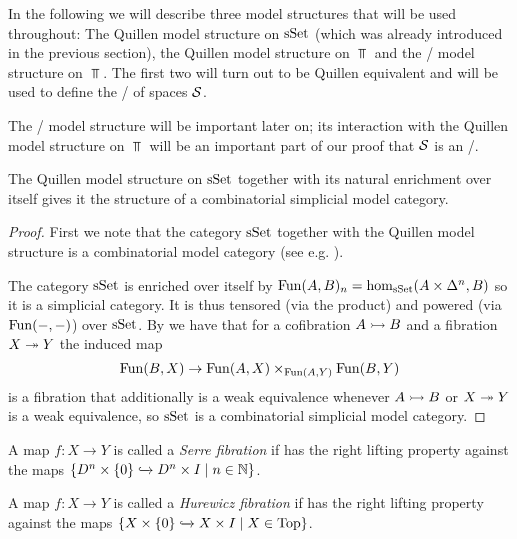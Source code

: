 In the following we will describe three model structures that will be used throughout: %
The Quillen model structure on $\operatorname{sSet}$ (which was already introduced in the previous section), the Quillen model structure on $\Top$ and the \Strom/ model structure on $\Top$.
The first two will turn out to be Quillen equivalent and will be used to define the \inftycat/ of spaces $\mathcal{S}$.

The \Strom/ model structure will be important later on; its interaction with the Quillen model structure on $\Top$ will be an important part of our proof that $\mathcal{S}$ is an \inftytop/.
\begin{prop}\label{prop:sSetCombSimpModelStructure}
    The Quillen model structure on $\operatorname{sSet}$ together with its natural enrichment over itself gives it the structure of a combinatorial simplicial model category.
    \begin{proof}
        First we note that the category $\operatorname{sSet}$ together with the Quillen model structure is a combinatorial model category (see e.g. \cite[Remark 7.11.15]{cisinski_2019}).
        
        The category $\operatorname{sSet}$ is enriched over itself by $\operatorname{Fun}(A,B)_n=\hom_{\operatorname{sSet}}(A\times\Delta^n,B)$ so it is a simplicial category.
        It is thus tensored (via the product) and powered (via $\operatorname{Fun}(-,-)$) over $\operatorname{sSet}$.
        By \cite[Corollary 1.4.5.6, Theorem 3.1.3.1 and Theorem 3.1.3.5]{kerodon} we have that for a cofibration $A\xtailrightarrow{} B$ and a fibration $X\xtwoheadrightarrow{} Y$ the induced map 
        \begin{equation*}
            \operatorname{Fun}(B,X)\to\operatorname{Fun}(A,X)\times_{\operatorname{Fun}(A,Y)}\operatorname{Fun}(B,Y)
        \end{equation*}
        is a fibration that additionally is a weak equivalence whenever $A\xtailrightarrow{} B$ or $X\xtwoheadrightarrow{} Y$ is a weak equivalence, so $\operatorname{sSet}$ is a combinatorial simplicial model category.
    \end{proof}
\end{prop}
\begin{definition}
    A map $f\colon X\to Y$ is called a \emph{Serre fibration} if has the right lifting property against the maps $\left\lbrace D^n\times\left\lbrace0\right\rbrace\xhookrightarrow{}D^n\times I\mid n\in\mathbb{N}\right\rbrace$.
\end{definition}
\begin{definition}
    A map $f\colon X\to Y$ is called a \emph{Hurewicz fibration} if has the right lifting property against the maps $\left\lbrace X\times\left\lbrace0\right\rbrace\xhookrightarrow{}X\times I\mid X\in\operatorname{Top}\right\rbrace$.
\end{definition}
